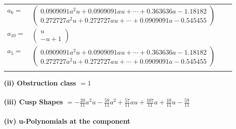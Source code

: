 \documentclass[1p]{elsarticle_modified}
\theoremstyle{definition}
\begin{document}
\begin{tabular}{m{7pt} m{180pt} m{7pt} m{180pt} }
\flushright $a_{6}=$&$\begin{pmatrix}0.0909091 a^{2} u+0.0909091 a u+\cdots+0.363636 a-1.18182\\0.272727 a^{2} u+0.272727 a u+\cdots+0.0909091 a-0.545455\end{pmatrix}$ \\
\flushright $a_{10}=$&$\begin{pmatrix}u\\- u+1\end{pmatrix}$ \\
\flushright $a_{5}=$&$\begin{pmatrix}0.0909091 a^{2} u+0.0909091 a u+\cdots+0.363636 a-1.18182\\0.272727 a^{2} u+0.272727 a u+\cdots+0.0909091 a-0.545455\end{pmatrix}$\\&\end{tabular}
\flushleft \textbf{(ii) Obstruction class $= 1$}\\~\\
\flushleft \textbf{(iii) Cusp Shapes $= -\frac{20}{11} a^2 u-\frac{58}{11} a^2+\frac{57}{11} a u+\frac{107}{11} a+\frac{10}{11} u-\frac{59}{11}$}\\~\\
\newpage\renewcommand{\arraystretch}{1}
\flushleft \textbf{(iv) u-Polynomials at the component}\newline \\
\end{document}
